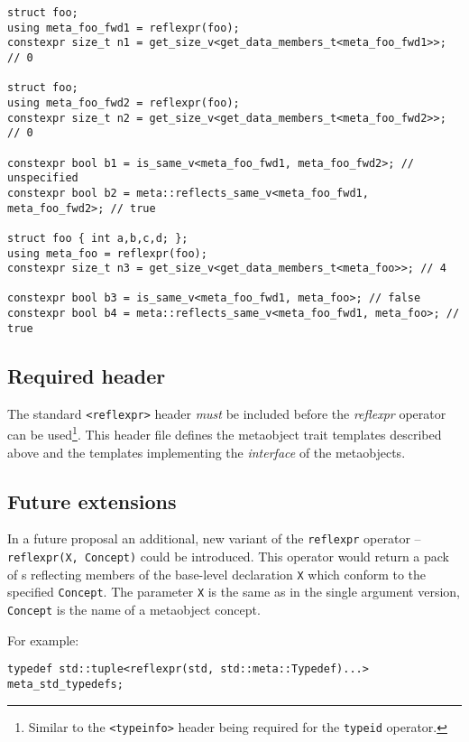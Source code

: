 \begin{verbatim}
struct foo;
using meta_foo_fwd1 = reflexpr(foo);
constexpr size_t n1 = get_size_v<get_data_members_t<meta_foo_fwd1>>; // 0

struct foo;
using meta_foo_fwd2 = reflexpr(foo);
constexpr size_t n2 = get_size_v<get_data_members_t<meta_foo_fwd2>>; // 0

constexpr bool b1 = is_same_v<meta_foo_fwd1, meta_foo_fwd2>; // unspecified
constexpr bool b2 = meta::reflects_same_v<meta_foo_fwd1, meta_foo_fwd2>; // true

struct foo { int a,b,c,d; };
using meta_foo = reflexpr(foo);
constexpr size_t n3 = get_size_v<get_data_members_t<meta_foo>>; // 4

constexpr bool b3 = is_same_v<meta_foo_fwd1, meta_foo>; // false
constexpr bool b4 = meta::reflects_same_v<meta_foo_fwd1, meta_foo>; // true
\end{verbatim}

\subsection{Required header}
\label{section-reflexpr-header}

The standard \texttt{<reflexpr>} header \emph{must} be included before
the \emph{reflexpr} operator can be used\footnote{Similar to the
\texttt{<typeinfo>} header being required for the \texttt{typeid} operator.}.
This header file defines the metaobject trait templates described above
and the templates implementing the \emph{interface} of the metaobjects.

\subsection{Future extensions}

In a future proposal an additional, new variant of the \texttt{reflexpr} operator
-- \texttt{reflexpr(X, Concept)} could be introduced.
This operator would return a pack of s reflecting members of
the base-level declaration \texttt{X} which conform to the specified
\texttt{Concept}. The parameter \texttt{X} is the same as in the single argument
version, \texttt{Concept} is the name of a metaobject concept.

For example:

\begin{verbatim}
typedef std::tuple<reflexpr(std, std::meta::Typedef)...> meta_std_typedefs;
\end{verbatim}
